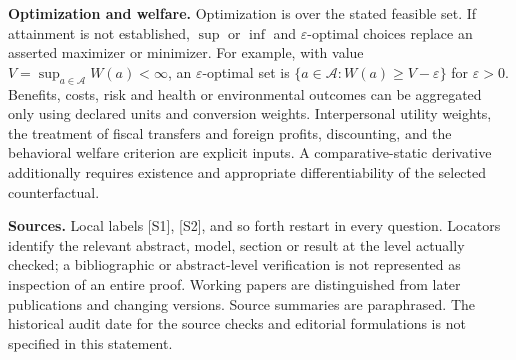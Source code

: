 \documentclass[11pt,a4paper]{article}
\begin{document}
\textbf{Optimization and welfare.} Optimization is over the stated feasible set. If attainment is not established, $\sup$ or $\inf$ and $\varepsilon$-optimal choices replace an asserted maximizer or minimizer. For example, with value $V=\sup_{a\in\mathcal A}W(a)<\infty$, an $\varepsilon$-optimal set is $\{a\in\mathcal A:W(a)\geq V-\varepsilon\}$ for $\varepsilon>0$. Benefits, costs, risk and health or environmental outcomes can be aggregated only using declared units and conversion weights. Interpersonal utility weights, the treatment of fiscal transfers and foreign profits, discounting, and the behavioral welfare criterion are explicit inputs. A comparative-static derivative additionally requires existence and appropriate differentiability of the selected counterfactual.

\textbf{Sources.} Local labels [S1], [S2], and so forth restart in every question. Locators identify the relevant abstract, model, section or result at the level actually checked; a bibliographic or abstract-level verification is not represented as inspection of an entire proof. Working papers are distinguished from later publications and changing versions. Source summaries are paraphrased. The historical audit date for the source checks and editorial formulations is not specified in this statement.
\end{document}

